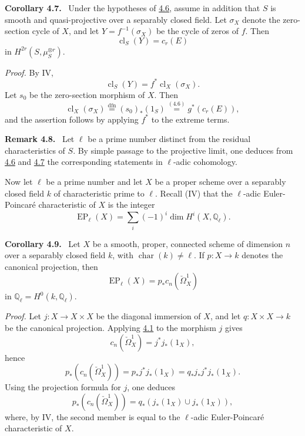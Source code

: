 \documentclass[11pt]{article}
\newenvironment{statement}[1]{\par\medskip\noindent\textbf{#1.}\ }{\par\medskip}
\providecommand{\cl}{\operatorname{cl}}
\providecommand{\cl}{\operatorname{cl}}
\providecommand{\cl}{\operatorname{cl}}
\begin{document}
\label{sga5:VII:corollary:4.7}\begin{statement}{Corollary 4.7}
Under the hypotheses of \hyperref[sga5:VII:corollary:4.6]{4.6}, assume in addition that $S$ is smooth and quasi-projective over a separably closed field. Let $\sigma_X$ denote the zero-section cycle of $X$, and let $Y=f^{-1}(\sigma_X)$ be the cycle of zeros of $f$. Then
\[
\cl_S(Y)=c_r(E)
\]
in $H^{2r}(S,\mu_S^{\otimes r})$.
\end{statement}

\emph{Proof.} By IV,
\[
\cl_S(Y)=f^*\cl_X(\sigma_X).
\]
Let $s_0$ be the zero-section morphism of $X$. Then
\[
\cl_X(\sigma_X)\stackrel{\mathrm{dfn}}{=}(s_0)_*(1_S)\stackrel{\hyperref[sga5:VII:corollary:4.6]{(4.6)}}{=}g^*(c_r(E)),
\]
and the assertion follows by applying $f^*$ to the extreme terms.

\label{sga5:VII:remark:4.8}\begin{statement}{Remark 4.8}
Let $\ell$ be a prime number distinct from the residual characteristics of $S$. By simple passage to the projective limit, one deduces from \hyperref[sga5:VII:corollary:4.6]{4.6} and \hyperref[sga5:VII:corollary:4.7]{4.7} the corresponding statements in $\ell$-adic cohomology.
\end{statement}

Now let $\ell$ be a prime number and let $X$ be a proper scheme over a separably closed field $k$ of characteristic prime to $\ell$. Recall (IV) that the $\ell$-adic Euler-Poincaré characteristic of $X$ is the integer
\[
\operatorname{EP}_\ell(X)=\sum_i(-1)^i\dim H^i(X,\mathbb Q_\ell).
\]

\label{sga5:VII:corollary:4.9}\begin{statement}{Corollary 4.9}
Let $X$ be a smooth, proper, connected scheme of dimension $n$ over a separably closed field $k$, with $\operatorname{char}(k)\ne\ell$. If $p:X\to k$ denotes the canonical projection, then
\[
\operatorname{EP}_\ell(X)=p_*c_n(\check\Omega^1_X)
\]
in $\mathbb Q_\ell=H^0(k,\mathbb Q_\ell)$.
\end{statement}

\emph{Proof.} Let $j:X\to X\times X$ be the diagonal immersion of $X$, and let $q:X\times X\to k$ be the canonical projection. Applying \hyperref[sga5:VII:theorem:4.1]{4.1} to the morphism $j$ gives
\[
c_n(\check\Omega^1_X)=j^*j_*(1_X),
\]
hence
\[
p_*(c_n(\check\Omega^1_X))=p_*j^*j_*(1_X)=q_*j_*j^*j_*(1_X).
\]
Using the projection formula for $j$, one deduces
\[
p_*(c_n(\check\Omega^1_X))=q_*(j_*(1_X)\cup j_*(1_X)),
\]
where, by IV, the second member is equal to the $\ell$-adic Euler-Poincaré characteristic of $X$.
\end{document}
